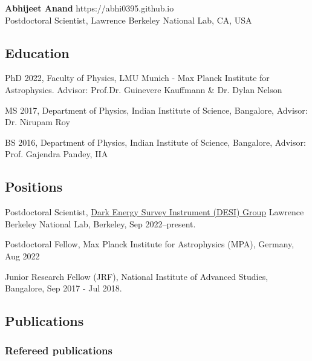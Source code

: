 \documentclass[12pt,letterpaper]{article}
\begin{document}
\thispagestyle{empty}\sloppy\sloppypar\raggedbottom

\textbf{\Large Abhijeet Anand} \hfill
\textsf{\small https://abhi0395.github.io} \\[0.5ex]
Postdoctoral Scientist, Lawrence Berkeley National Lab, CA, USA\\[0.5ex]

\subsection{Education}
\begin{list}{}{\cvlist}
  \item
        PhD 2022, Faculty of Physics, LMU Munich - Max Planck Institute for Astrophysics. Advisor: Prof.Dr. Guinevere Kauffmann \& Dr. Dylan Nelson
  \item
        MS 2017, Department of Physics, Indian Institute of Science, Bangalore, Advisor: Dr. Nirupam Roy
  \item
        BS 2016, Department of Physics, Indian Institute of Science, Bangalore, Advisor: Prof. Gajendra Pandey, IIA
\end{list}

\subsection{Positions}
\begin{list}{}{\cvlist}
  \item
      Postdoctoral Scientist, \href{https://www.desi.lbl.gov/}{Dark Energy Survey Instrument (DESI) Group} Lawrence Berkeley National Lab, Berkeley, Sep 2022--present.
  \item
        Postdoctoral Fellow, Max Planck Institute for Astrophysics (MPA), Germany, Aug 2022
  \item
        Junior Research Fellow (JRF), National Institute of Advanced Studies, Bangalore, Sep 2017 - Jul 2018.
\end{list}

\ifdefined\withpubs
  \subsection{Publications}
  

  \subsubsection{Refereed publications}
  \begin{list}{}{\cvlist}
    
  \end{list}
\end{document}
